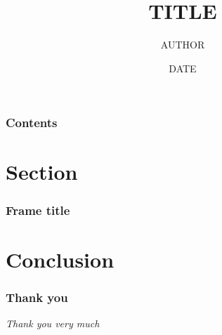 \documentclass{beamer}
\title[TITLE]
{\large TITLE}
\author[AUTHOR] %
{AUTHOR}
\date[DATE] %
{DATE}
\institute[INSTITUTION] %
{INSTITUTION}
\begin{document}
\def\newblock{\hskip .11em plus .33em minus .07em}
\graphicspath{{../figs/}}

\begin{frame}
  \titlepage
\end{frame}

\begin{frame}
  \frametitle{Contents}
	\tableofcontents
\end{frame}

\section{Section}

\begin{frame}
  \frametitle{Frame title}
\end{frame}


\section{Conclusion}

\begin{frame}
  \frametitle{Thank you}
	\LARGE
	\vspace{4cm}
	\emph{Thank you very much}
\end{frame}
\end{document}

